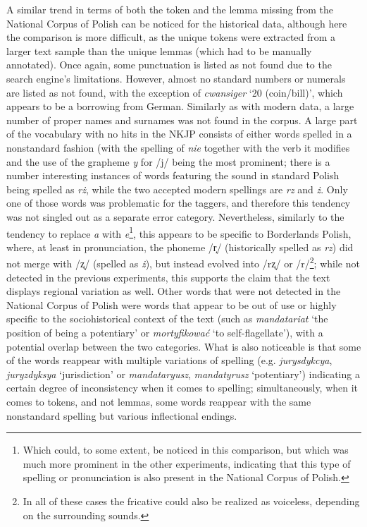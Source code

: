 A similar trend in terms of both the token and the lemma missing from the National Corpus of Polish can be noticed for the historical data, although here the comparison is more difficult, as the unique tokens were extracted from a larger text sample than the unique lemmas (which had to be manually annotated). Once again, some punctuation is listed as not found due to the search engine's limitations. However, almost no standard numbers or numerals are listed as not found, with the exception of \textit{cwansiger} `20 (coin/bill)', which appears to be a borrowing from German. Similarly as with modern data, a large number of proper names and surnames was not found in the corpus. A large part of the vocabulary with no hits in the NKJP consists of either words spelled in a nonstandard fashion (with the spelling of \textit{nie} together with the verb it modifies and the use of the grapheme \textit{y} for /j/ being the most prominent; there is a number interesting instances of words featuring the sound \textipa{/\textrtailz/} in standard Polish being spelled as \textit{rż}, while the two accepted modern spellings are \textit{rz} and \textit{ż}. Only one of those words was problematic for the taggers, and therefore this tendency was not singled out as a separate error category. Nevertheless, similarly to the tendency to replace \textit{a} with \textit{e}\footnote{Which could, to some extent, be noticed in this comparison, but which was much more prominent in the other experiments, indicating that this type of spelling or pronunciation is also present in the National Corpus of Polish.}, this appears to be specific to Borderlands Polish, where, at least in pronunciation, the phoneme /r̝/ (historically spelled as \textit{rz}) did not merge with /ʐ/ (spelled as \textit{ż}), but instead evolved into /rʐ/ or /r/\footnote{In all of these cases the fricative could also be realized as voiceless, depending on the surrounding sounds.}; while not detected in the previous experiments, this supports the claim that the text displays regional variation as well. Other words that were not detected in the National Corpus of Polish were words that appear to be out of use or highly specific to the sociohistorical context of the text (such as \textit{mandatariat} `the position of being a potentiary' or \textit{mortyfikować} `to self-flagellate'), with a potential overlap between the two categories. What is also noticeable is that some of the words reappear with multiple variations of spelling (e.g. \textit{jurysdykcya}, \textit{juryzdyksya} `jurisdiction' or \textit{mandataryusz}, \textit{mandatyrusz} `potentiary') indicating a certain degree of inconsistency when it comes to spelling; simultaneously, when it comes to tokens, and not lemmas, some words reappear with the same nonstandard spelling but various inflectional endings. 

